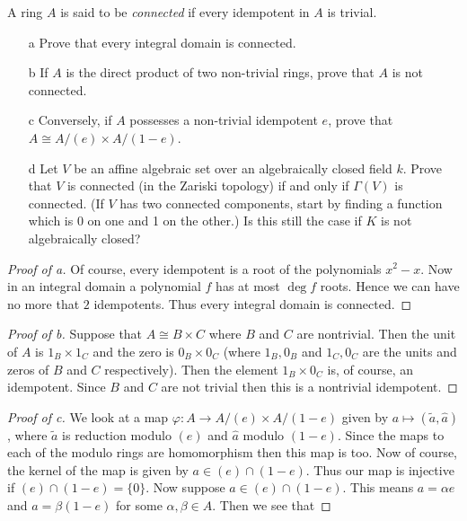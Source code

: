 \documentclass{article}
\begin{document}
\begin{problem}[Irreducibility]
  A ring $A$ is said to be {\it connected} if every idempotent in $A$ is
  trivial.
  \begin{enumerate}
    \item [a] Prove that every integral domain is connected.
    \item [b] If $A$ is the direct product of two non-trivial rings, prove
      that $A$ is not connected.
    \item [c] Conversely, if $A$ possesses a non-trivial idempotent $e$,
      prove that $A\cong A/(e)\times A/(1-e)$.
    \item [d] Let $V$ be an affine algebraic set over an algebraically
      closed field $k$. Prove that $V$ is connected (in the Zariski
      topology) if and only if $\Gamma(V)$ is connected. (If $V$ has two
      connected components, start by finding a function which is $0$ on one
      and 1 on the other.) Is this still the case if $K$ is not
      algebraically closed?
  \end{enumerate}
  \begin{proof}[Proof of a]
    Of course, every idempotent is a root of the polynomials $x^2-x$. Now in an
    integral domain a polynomial $f$ has at most $\deg f$ roots. Hence we can
    have no more that $2$ idempotents. Thus every integral domain is connected.
  \end{proof}
  \begin{proof}[Proof of b]
    Suppose that $A\cong B\times C$ where $B$ and $C$ are nontrivial. Then the
    unit of $A$ is $1_B\times 1_C$ and the zero is $0_B\times 0_C$ (where
    $1_B,0_B$
    and $1_C,0_C$ are the units and zeros of $B$ and $C$ respectively). Then the
    element $1_B\times0_C$ is, of course, an idempotent. Since $B$ and $C$ are
    not trivial then this is a nontrivial idempotent.
  \end{proof}
  \begin{proof}[Proof of c]
    We look at a map $\varphi:A\rightarrow A/(e)\times A/(1-e)$ given by $a\mapsto
    (\tilde{a},\hat{a})$, where $\tilde{a}$ is reduction modulo $(e)$ and
    $\hat{a}$ modulo $(1-e)$. Since the maps to each of the modulo rings are
    homomorphism then this map is too. Now of course, the kernel of the map is
    given by $a\in (e)\cap(1-e)$. Thus our map is injective if
    $(e)\cap(1-e)=\{0\}$. Now suppose $a\in(e)\cap(1-e)$. This means $a=\alpha
    e$ and $a=\beta(1-e)$ for some $\alpha,\beta\in A$. Then we see that

\end{proof}
\end{problem}
\end{document}
